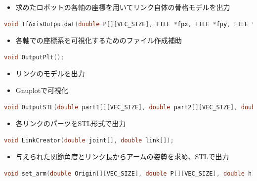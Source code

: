 \documentclass[a4paper,10pt]{jsarticle}
\begin{document}
\begin{itemize}
 \item 求めたロボットの各軸の座標を用いてリンク自体の骨格モデルを出力
\end{itemize}

\begin{lstlisting}[basicstyle=\ttfamily\footnotesize, language=C, frame=single, numbers=none, breaklines=true]
void TfAxisOutputdat(double P[][VEC_SIZE], FILE *fpx, FILE *fpy, FILE *fpz);
\end{lstlisting}

\begin{itemize}
 \item 各軸での座標系を可視化するためのファイル作成補助
\end{itemize}

\begin{lstlisting}[basicstyle=\ttfamily\footnotesize, language=C, frame=single, numbers=none, breaklines=true]
void OutputPlt();
\end{lstlisting}

\begin{itemize}
 \item リンクのモデルを出力
 \item Gnuplotで可視化
\end{itemize}

\begin{lstlisting}[basicstyle=\ttfamily\footnotesize, language=C, frame=single, numbers=none, breaklines=true]
void OutputSTL(double part1[][VEC_SIZE], double part2[][VEC_SIZE], double part3[][VEC_SIZE]);
\end{lstlisting}

\begin{itemize}
 \item 各リンクのパーツをSTL形式で出力
\end{itemize}

\begin{lstlisting}[basicstyle=\ttfamily\footnotesize, language=C, frame=single, numbers=none, breaklines=true]
void LinkCreator(double joint[], double link[]);
\end{lstlisting}

\begin{itemize}
 \item 与えられた関節角度とリンク長からアームの姿勢を求め、STLで出力
\end{itemize}

\begin{lstlisting}[basicstyle=\ttfamily\footnotesize, language=C, frame=single, numbers=none, breaklines=true]
void set_arm(double Origin[][VEC_SIZE], double P[][VEC_SIZE], double h);
\end{lstlisting}
\end{document}
